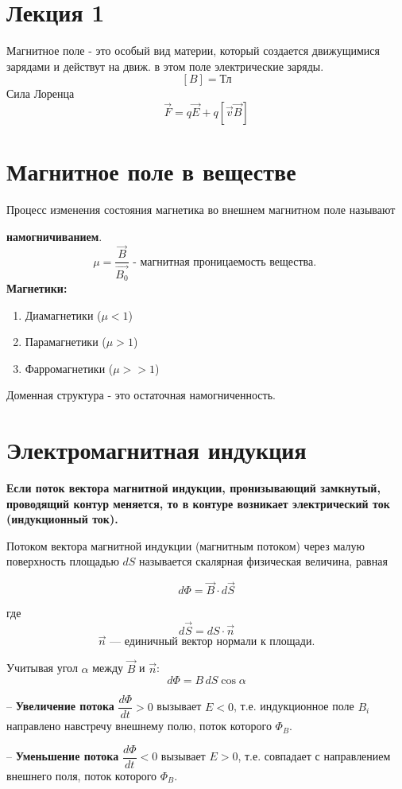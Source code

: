 \section*{Лекция 1}
Магнитное поле - это особый вид материи, который создается движущимися зарядами и действут на движ. в этом поле электрические заряды.
\[[B] = \text{Тл}\]
Сила Лоренца $$ \vec{F} = q\vec{E} + q[\vec{v} \vec{B}] $$
\section*{Магнитное поле в веществе}
Процесс изменения состояния магнетика во внешнем магнитном поле называют \par\textbf{намогничиванием}.
$$ \mu = \dfrac{\vec{B}}{\vec{B_0}} \text{ - магнитная проницаемость вещества. }$$
\textbf{Магнетики: }
\renewcommand{\labelenumii}{\arabic{enumi}.\arabic{enumii}.}
\begin{enumerate}
    \item Диамагнетики ($\mu < 1$)
    \item Парамагнетики ($\mu > 1$)
    \item Фарромагнетики ($\mu >> 1$)
\end{enumerate}
Доменная структура - это остаточная намогниченность.\par
\section*{Электромагнитная индукция}
\textbf{Если поток вектора магнитной индукции, пронизывающий замкнутый, проводящий контур меняется, то в контуре возникает электрический ток (индукционный ток).}

\vspace{1em}

Потоком вектора магнитной индукции (магнитным потоком) через малую поверхность площадью $dS$ называется скалярная физическая величина, равная

\[
d\Phi = \vec{B} \cdot d\vec{S}
\]

\noindent где
\[
d\vec{S} = dS \cdot \vec{n}
\]
\[
\vec{n} \text{ --- единичный вектор нормали к площади.}
\]

\vspace{1em}

\noindent Учитывая угол $\alpha$ между $\vec{B}$ и $\vec{n}$:
\[
d\Phi = B \, dS \cos\alpha
\]
\par
-- \textbf{Увеличение потока} $\dfrac{d\Phi}{dt} > 0$ вызывает $E < 0$, т.е. индукционное поле $B_i$ направлено навстречу внешнему полю, поток которого $\Phi_B$. \par
-- \textbf{Уменьшение потока} $\dfrac{d\Phi}{dt} < 0$ вызывает $E > 0$, т.е. совпадает с направлением внешнего поля, поток которого $\Phi_B$.
\pagebreak

